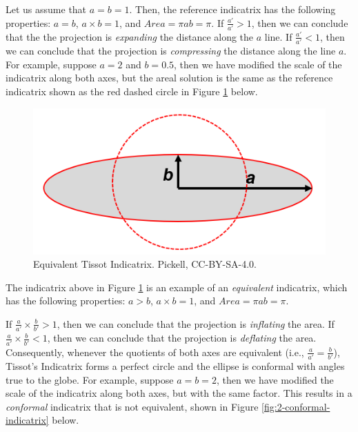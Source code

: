 \documentclass[
]{book}
\begin{document}
Let us assume that \(a = b = 1\). Then, the reference indicatrix has the following properties: \(a=b\), \(a×b=1\), and \(Area=πab=π\). If \(\frac{a'}{a'}>1\), then we can conclude that the the projection is \emph{expanding} the distance along the \(a\) line. If \(\frac{a'}{a'}<1\), then we can conclude that the projection is \emph{compressing} the distance along the line \(a\). For example, suppose \(a=2\) and \(b=0.5\), then we have modified the scale of the indicatrix along both axes, but the areal solution is the same as the reference indicatrix shown as the red dashed circle in Figure \ref{fig:2-reference-equivalent} below.

\begin{figure}
\includegraphics[width=0.75\linewidth]{images/02-equivalent-indicatrix} \caption{Equivalent Tissot Indicatrix. Pickell, CC-BY-SA-4.0.}\label{fig:2-reference-equivalent}
\end{figure}

The indicatrix above in Figure \ref{fig:2-reference-equivalent} is an example of an \emph{equivalent} indicatrix, which has the following properties: \(a>b\), \(a×b=1\), and \(Area=πab=π\).

If \(\frac{a}{a'}×\frac{b}{b'}>1\), then we can conclude that the projection is \emph{inflating} the area. If \(\frac{a}{a'}×\frac{b}{b'}<1\), then we can conclude that the projection is \emph{deflating} the area. Consequently, whenever the quotients of both axes are equivalent (i.e., \(\frac{a}{a'}=\frac{b}{b'}\)), Tissot's Indicatrix forms a perfect circle and the ellipse is conformal with angles true to the globe. For example, suppose \(a=b=2\), then we have modified the scale of the indicatrix along both axes, but with the same factor. This results in a \emph{conformal} indicatrix that is not equivalent, shown in Figure \ref{fig:2-conformal-indicatrix} below.
\end{document}
